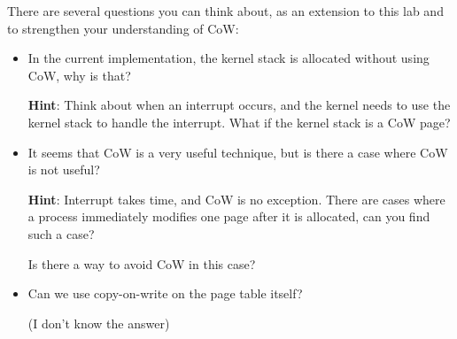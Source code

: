 There are several questions you can think about, as an extension to this lab and to
strengthen your understanding of CoW:

\begin{itemize}
    \item In the current implementation, the kernel stack is allocated without
          using CoW, why is that?

          \textbf{Hint}: Think about when an interrupt occurs, and the kernel
          needs to use the kernel stack to handle the interrupt. What if the
          kernel stack is a CoW page?

    \item It seems that CoW is a very useful technique, but is there a case
          where CoW is not useful?

          \textbf{Hint}: Interrupt takes time, and CoW is no exception.
          There are cases where a process immediately modifies one page after it is
          allocated, can you find such a case?

          Is there a way to avoid CoW in this case?

    \item Can we use copy-on-write on the page table itself?

          (I don't know the answer)
\end{itemize}
